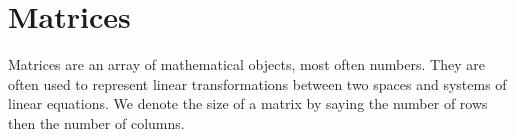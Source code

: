 \section{Matrices}
\noindent
Matrices are an array of mathematical objects, most often numbers. They are often used to represent linear transformations between two spaces and systems of linear equations. We denote the size of a matrix by saying the number of rows then the number of columns.

\ifodd{}\fi





